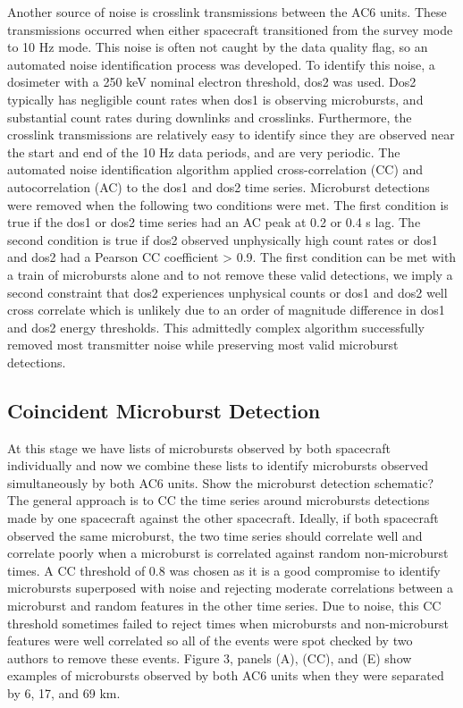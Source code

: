 \documentclass[draft]{agujournal2019}
\begin{document}
Another source of noise is crosslink transmissions between the AC6 units. These transmissions occurred when either spacecraft transitioned from the survey mode to 10 Hz mode. This noise is often not caught by the data quality flag, so an automated noise identification process was developed. To identify this noise, a dosimeter with a 250 keV nominal electron threshold, dos2 was used. Dos2 typically has negligible count rates when dos1 is observing microbursts, and substantial count rates during downlinks and crosslinks. Furthermore, the crosslink transmissions are relatively easy to identify since they are observed near the start and end of the 10 Hz data periods, and are very periodic. The automated noise identification algorithm applied cross-correlation (CC) and autocorrelation (AC) to the dos1 and dos2 time series. Microburst detections were removed when the following two conditions were met. The first condition is true if the dos1 or dos2 time series had an AC peak at 0.2 or 0.4 s lag. The second condition is true if dos2 observed unphysically high count rates or dos1 and dos2 had a Pearson CC coefficient > 0.9. The first condition can be met with a train of microbursts alone and to not remove these valid detections, we imply a second constraint that dos2 experiences unphysical counts or dos1 and dos2 well cross correlate which is unlikely due to an order of magnitude difference in dos1 and dos2 energy thresholds. This admittedly complex algorithm successfully removed most transmitter noise while preserving most valid microburst detections.

\subsection{Coincident Microburst Detection}
At this stage we have lists of microbursts observed by both spacecraft individually and now we combine these lists to identify microbursts observed simultaneously by both AC6 units. Show the microburst detection schematic? The general approach is to CC the time series around microbursts detections made by one spacecraft against the other spacecraft. Ideally, if both spacecraft observed the same microburst, the two time series should correlate well and correlate poorly when a microburst is correlated against random non-microburst times. A CC threshold of 0.8 was chosen as it is a good compromise to identify microbursts superposed with noise and rejecting moderate correlations between a microburst and random features in the other time series.  Due to noise, this CC threshold sometimes failed to reject times when microbursts and non-microburst features were well correlated so all of the events were spot checked by two authors to remove these events. Figure 3, panels (A), (CC), and (E) show examples of microbursts observed by both AC6 units when they were separated by 6, 17, and 69 km.
\end{document}
